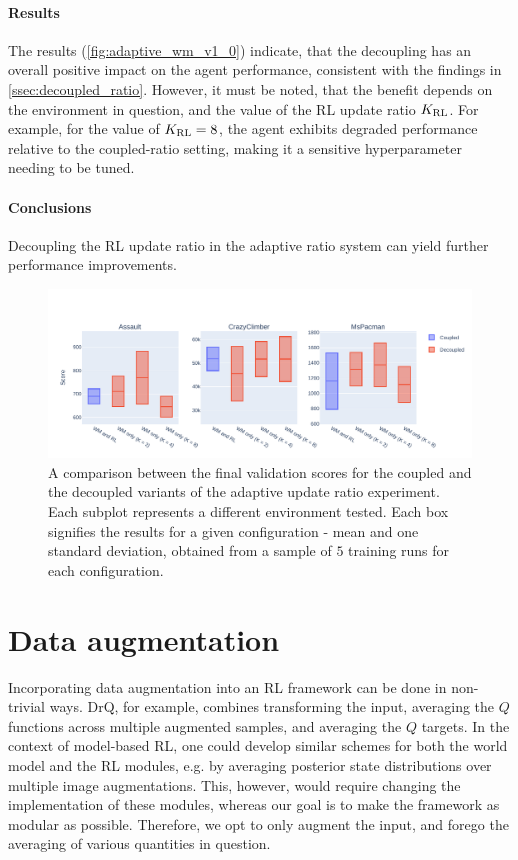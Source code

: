 \documentclass[en]{pracamgr}
\newcommand{\figurewidth}{\linewidth}
\newcommand{\figureheight}{0.8\paperheight}
\begin{document}
\paragraph{Results} The results (\autoref{fig:adaptive_wm_v1_0}) indicate, that the decoupling has an overall positive impact on the agent performance, consistent with the findings in \autoref{ssec:decoupled_ratio}. However, it must be noted, that the benefit depends on the environment in question, and the value of the RL update ratio $K_{\rm RL}$. For example, for the value of $K_{\rm RL} = 8$, the agent exhibits degraded performance relative to the coupled-ratio setting, making it a sensitive hyperparameter needing to be tuned.

\paragraph{Conclusions} Decoupling the RL update ratio in the adaptive ratio system can yield further performance improvements.

\begin{figure}
  \centering
  \includegraphics[width=\figurewidth,height=\figureheight,keepaspectratio]{assets/adaptive_wm_v1_0.pdf}
  \caption{A comparison between the final validation scores for the coupled and the decoupled variants of the adaptive update ratio experiment. Each subplot represents a different environment tested. Each box signifies the results for a given configuration - mean and one standard deviation, obtained from a sample of $5$ training runs for each configuration.}
  \label{fig:adaptive_wm_v1_0}
\end{figure}

\section{Data augmentation}

Incorporating data augmentation into an RL framework can be done in non-trivial ways. DrQ, for example, combines transforming the input, averaging the $Q$ functions across multiple augmented samples, and averaging the $Q$ targets. In the context of model-based RL, one could develop similar schemes for both the world model and the RL modules, e.g. by averaging posterior state distributions over multiple image augmentations. This, however, would require changing the implementation of these modules, whereas our goal is to make the framework as modular as possible. Therefore, we opt to only augment the input, and forego the averaging of various quantities in question.
\end{document}
